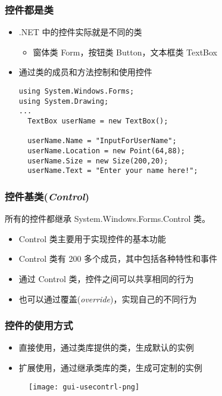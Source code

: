 \begin{frame}[fragile]
\frametitle{控件都是类}
\begin{itemize}
\item .NET 中的控件实际就是不同的类
  \begin{itemize}
  \item 窗体类 Form，按钮类 Button，文本框类 TextBox
  \end{itemize}
\item 通过类的成员和方法控制和使用控件
\begin{lstlisting}
using System.Windows.Forms;
using System.Drawing;
...
  TextBox userName = new TextBox();
  
  userName.Name = "InputForUserName";
  userName.Location = new Point(64,88);
  userName.Size = new Size(200,20);
  userName.Text = "Enter your name here!";
\end{lstlisting}
\end{itemize}
\end{frame}

\begin{frame}[fragile]
\frametitle{控件基类(\textit{Control})}
所有的控件都继承 System.Windows.Forms.Control 类。
\begin{itemize}
\item Control 类主要用于实现控件的基本功能
\item Control 类有 200 多个成员，其中包括各种特性和事件
\item 通过 Control 类，控件之间可以共享相同的行为
\item 也可以通过{\redwarn 覆盖}(\textit{override})，实现自己的不同行为
\end{itemize}
\begin{figure}[htbp]
  \centering
  
\end{figure}
\end{frame}

\begin{frame}[fragile]
\frametitle{控件的使用方式}
\begin{itemize}
\item 直接使用，通过类库提供的类，生成默认的实例
\item 扩展使用，通过继承类库的类，生成可定制的实例
\end{itemize}
\begin{figure}[htbp]
  \centering
  \texttt{[image: gui-usecontrl-png]}
\end{figure}
\end{frame}

